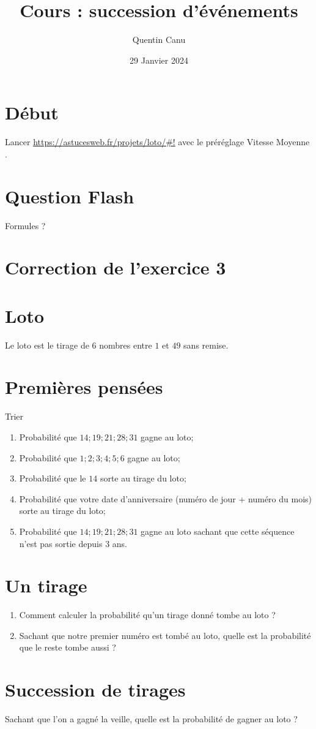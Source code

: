\documentclass{article}
\title{Cours : succession d'événements}
\date{29 Janvier 2024}
\author{Quentin Canu}
\begin{document}
\maketitle

\section{Début}

Lancer \url{https://astucesweb.fr/projets/loto/#!} avec le préréglage \og Vitesse Moyenne \fg.

\section{Question Flash}

Formules ?

\section{Correction de l'exercice 3}

\section{Loto}

\begin{definition}
Le loto est le tirage de $6$ nombres entre $1$ et $49$ sans remise.    
\end{definition}

\section{Premières pensées}
Trier
\begin{enumerate}
\item Probabilité que $14;19;21;28;31$ gagne au loto;
\item Probabilité que $1;2;3;4;5;6$ gagne au loto;
\item Probabilité que le $14$ sorte au tirage du loto;
\item Probabilité que votre date d'anniversaire (numéro de jour + numéro du mois) sorte au tirage du loto;
\item Probabilité que $14;19;21;28;31$ gagne au loto sachant que cette séquence n'est pas sortie depuis $3$ ans.
\end{enumerate}
\section{Un tirage}
\begin{enumerate}
\item Comment calculer la probabilité qu'un tirage donné tombe au loto ?
\item Sachant que notre premier numéro est tombé au loto, quelle est la probabilité que le reste tombe aussi ?
\end{enumerate}
\section{Succession de tirages}
Sachant que l'on a gagné la veille, quelle est la probabilité de gagner au loto ?
\end{document}

